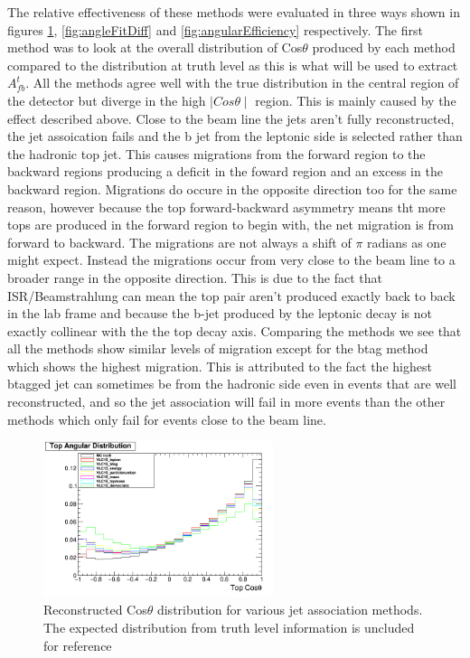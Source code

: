 The relative effectiveness of these methods were evaluated in three ways shown in figures \ref{fig:methodComparison}, \ref{fig:angleFitDiff} and \ref{fig:angularEfficiency} respectively. The first method was to look at the overall distribution of Cos$\theta$ produced by each method compared to the distribution at truth level as this is what will be used to extract $A_{fb}^{t}$. All the methods agree well with the true distribution in the central region of the detector but diverge in the high $\mid Cos\theta\mid$ region. This is mainly caused by the effect described above. Close to the beam line the jets aren't fully reconstructed, the jet assoication fails and the b jet from the leptonic side is selected rather than the hadronic top jet. This causes migrations from the forward region to the backward regions producing a deficit in the foward region and an excess in the backward region. Migrations do occure in the opposite direction too for the same reason, however because the top forward-backward asymmetry means tht more tops are produced in the forward region to begin with, the net migration is from forward to backward. The migrations are not always a shift of $\pi$ radians as one might expect. Instead the migrations occur from very close to the beam line to a broader range in the opposite direction. This is due to the fact that ISR/Beamstrahlung can mean the top pair aren't produced exactly back to back in the lab frame and because the b-jet produced by the leptonic decay is not exactly collinear with the the top decay axis. Comparing the methods we see that all the methods show similar levels of migration except for the btag method which shows the highest migration. This is attributed to the fact the highest btagged jet can sometimes be from the hadronic side even in events that are well reconstructed, and so the jet association will fail in more events than the other methods which only fail for events close to the beam line.

\begin{figure}
  \centering
  \includegraphics[width=0.6\textwidth]{figures/comparejetmethods.png}
  \caption[Reconstructed Cos$\theta$ distribution for various jet association methods]{Reconstructed Cos$\theta$ distribution for various jet association methods. The expected distribution from truth level information is uncluded for reference}
  \label{fig:methodComparison}
\end{figure}

